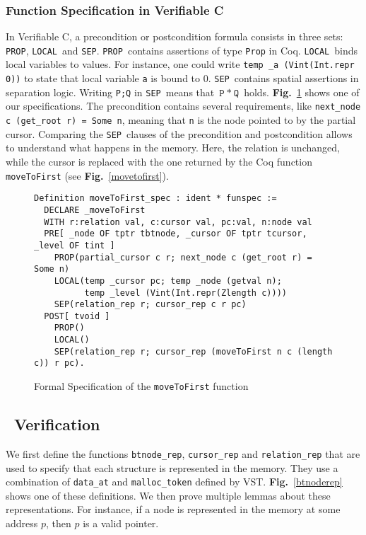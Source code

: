 \def\prop{\lstinline[language=Coq]{PROP}}
\def\local{\lstinline[language=Coq]{LOCAL}}
\def\sep{\lstinline[language=Coq]{SEP}}

\subsubsection{Function Specification in Verifiable C}
In Verifiable C, a precondition or postcondition formula consists in three sets: \prop, \local\ and \sep.
\prop\ contains assertions of type \texttt{Prop} in Coq.
\local\ binds local variables to values. For instance, one could write \texttt{temp \_a (Vint(Int.repr 0))} to state that local variable \texttt{a} is bound to 0.
\sep\ contains spatial assertions in separation logic. Writing \texttt{P;Q} in \sep\ means that $\texttt{P}~*~\texttt{Q}$ holds.
\textbf{Fig.}~\ref{spec} shows one of our specifications.
The precondition contains several requirements, like \texttt{next\_node c (get\_root r) = Some n}, meaning that \texttt{n} is the node pointed to by the partial cursor.
Comparing the \sep\ clauses of the precondition and postcondition allows to understand what happens in the memory.
Here, the relation is unchanged, while the cursor is replaced with the one returned by the Coq function \texttt{moveToFirst} (see \textbf{Fig.}~\ref{movetofirst}).

\begin{figure}
\begin{lstlisting}[language=Coq]
Definition moveToFirst_spec : ident * funspec :=
  DECLARE _moveToFirst
  WITH r:relation val, c:cursor val, pc:val, n:node val
  PRE[ _node OF tptr tbtnode, _cursor OF tptr tcursor, _level OF tint ]
    PROP(partial_cursor c r; next_node c (get_root r) = Some n)
    LOCAL(temp _cursor pc; temp _node (getval n);
          temp _level (Vint(Int.repr(Zlength c))))
    SEP(relation_rep r; cursor_rep c r pc)
  POST[ tvoid ]
    PROP()
    LOCAL()
    SEP(relation_rep r; cursor_rep (moveToFirst n c (length c)) r pc).
\end{lstlisting}
\caption{Formal Specification of the \texttt{moveToFirst} function}
\label{spec}
\end{figure}



\subsection{\btrees\ Verification}
We first define the functions \texttt{btnode\_rep}, \texttt{cursor\_rep} and \texttt{relation\_rep} that are used to specify that each structure is represented in the memory.
They use a combination of \texttt{data\_at} and \texttt{malloc\_token} defined by VST.
\textbf{Fig.}~\ref{btnoderep} shows one of these definitions.
We then prove multiple lemmas about these representations. For instance, if a node is represented in the memory at some address $p$, then $p$ is a valid pointer.


